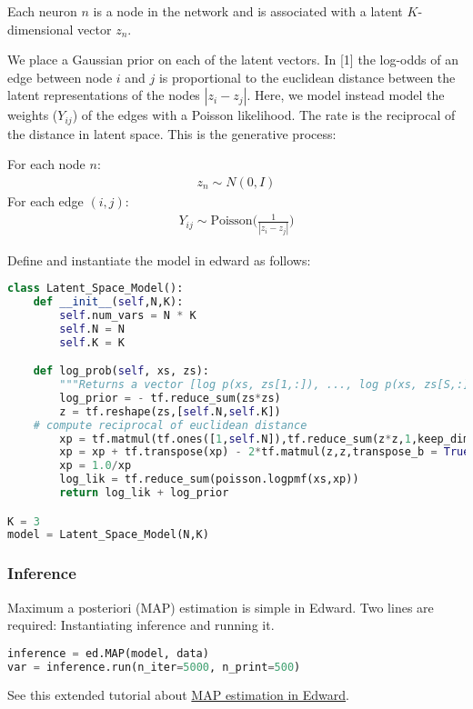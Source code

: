 Each neuron $n$ is a node in the network and is associated with a latent $K$-dimensional vector $z_n$.

We place a Gaussian prior on each of the latent vectors.
In [1] the log-odds of an edge between node $i$ and $j$ is proportional to the euclidean distance between the latent representations of the nodes $|z_i- z_j|$. Here, we model instead model the weights ($Y_{ij}$) of the edges with a Poisson likelihood. The rate is the reciprocal of the distance in latent space. This is the generative process:

For each node $n$:
\begin{align}
z_n \sim N(0,I)
\end{align}
For each edge $(i,j)$:
\begin{align}
Y_{ij} \sim \text{Poisson}\Bigg(\frac{1}{|z_i - z_j|}\Bigg)
\end{align}

Define and instantiate the model in edward as follows:
\begin{lstlisting}[language=Python]
class Latent_Space_Model():
    def __init__(self,N,K):
        self.num_vars = N * K
        self.N = N
        self.K = K

    def log_prob(self, xs, zs):
        """Returns a vector [log p(xs, zs[1,:]), ..., log p(xs, zs[S,:])]."""
        log_prior = - tf.reduce_sum(zs*zs)
        z = tf.reshape(zs,[self.N,self.K])
	# compute reciprocal of euclidean distance
        xp = tf.matmul(tf.ones([1,self.N]),tf.reduce_sum(z*z,1,keep_dims=True))
        xp = xp + tf.transpose(xp) - 2*tf.matmul(z,z,transpose_b = True)
        xp = 1.0/xp
        log_lik = tf.reduce_sum(poisson.logpmf(xs,xp))
        return log_lik + log_prior

K = 3
model = Latent_Space_Model(N,K)
\end{lstlisting}

\subsubsection{Inference}

Maximum a posteriori (MAP) estimation is simple in Edward. Two lines are
required: Instantiating inference and running it.
\begin{lstlisting}[language=Python]
inference = ed.MAP(model, data)
var = inference.run(n_iter=5000, n_print=500)
\end{lstlisting}

See this extended tutorial about 
\href{tut_MAP.html}{MAP estimation in Edward}.

